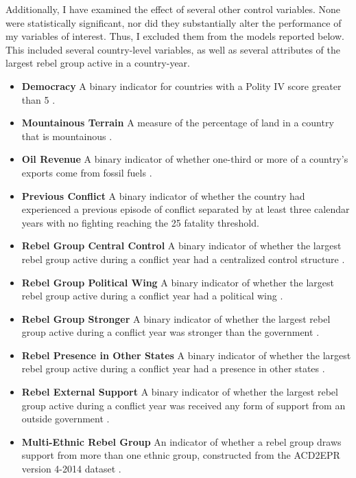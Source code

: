 \documentclass[12pt,]{book}
\providecommand{\tightlist}{%
  \setlength{\itemsep}{0pt}\setlength{\parskip}{0pt}}
\begin{document}
Additionally, I have examined the effect of several other control
variables. None were statistically significant, nor did they
substantially alter the performance of my variables of interest. Thus, I
excluded them from the models reported below. This included several
country-level variables, as well as several attributes of the largest
rebel group active in a country-year.

\begin{itemize}
\tightlist
\item
  \textbf{Democracy} A binary indicator for countries with a Polity IV
  score greater than 5 \citep{Marshall2012}.
\item
  \textbf{Mountainous Terrain} A measure of the percentage of land in a
  country that is mountainous \citep{fearonlaitin03}.
\item
  \textbf{Oil Revenue} A binary indicator of whether one-third or more
  of a country's exports come from fossil fuels \citep{fearonlaitin03}.
\item
  \textbf{Previous Conflict} A binary indicator of whether the country
  had experienced a previous episode of conflict separated by at least
  three calendar years with no fighting reaching the 25 fatality
  threshold.
\item
  \textbf{Rebel Group Central Control} A binary indicator of whether the
  largest rebel group active during a conflict year had a centralized
  control structure \citep{Cunningham2013}.
\item
  \textbf{Rebel Group Political Wing} A binary indicator of whether the
  largest rebel group active during a conflict year had a political wing
  \citep{Cunningham2013}.
\item
  \textbf{Rebel Group Stronger} A binary indicator of whether the
  largest rebel group active during a conflict year was stronger than
  the government \citep{Cunningham2013}.
\item
  \textbf{Rebel Presence in Other States} A binary indicator of whether
  the largest rebel group active during a conflict year had a presence
  in other states \citep{Cunningham2013}.
\item
  \textbf{Rebel External Support} A binary indicator of whether the
  largest rebel group active during a conflict year was received any
  form of support from an outside government \citep{Cunningham2013}.
\item
  \textbf{Multi-Ethnic Rebel Group} An indicator of whether a rebel
  group draws support from more than one ethnic group, constructed from
  the ACD2EPR version 4-2014 dataset \citep{Vogt2015}.
\end{itemize}
\end{document}
